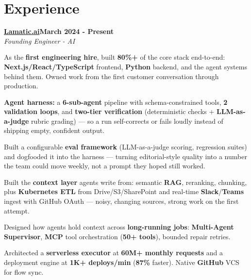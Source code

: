 \documentclass[letterpaper,10pt]{article}
\newcommand{\heading}[2]{
  \hspace{10pt}#1\hfill#2\\
}
\newcommand{\headingBf}[2]{
  \heading{\textbf{#1}}{\textbf{#2}}
}
\newcommand{\headingIt}[2]{
  \heading{\textit{#1}}{\textit{#2}}
}
\newenvironment{resume_list}{
  \vspace{-7pt}
  \begin{itemize}[itemsep=-2px, parsep=1pt, leftmargin=30pt]
}{
  \end{itemize}
}
\begin{document}

  \section{Experience}

\headingBf{\href{https://lamatic.ai/}{Lamatic.ai}}{March 2024 - Present}
\headingIt{Founding Engineer - AI}{}

\begin{resume_list}
\item As the \textbf{first engineering hire}, built \textbf{80\%+} of the core stack end-to-end: \textbf{Next.js/React/TypeScript} frontend, \textbf{Python} backend, and the agent systems behind them. Owned work from the first customer conversation through production.

\item \textbf{Agent harness:} a \textbf{6-sub-agent} pipeline with schema-constrained tools, \textbf{2 validation loops}, and \textbf{two-tier verification} (deterministic checks + \textbf{LLM-as-a-judge} rubric grading) --- so a run self-corrects or fails loudly instead of shipping empty, confident output.

\item Built a configurable \textbf{eval framework} (LLM-as-a-judge scoring, regression suites) and dogfooded it into the harness --- turning editorial-style quality into a number the team could move weekly, not a prompt they hoped still worked.

\item Built the \textbf{context layer} agents write from: semantic \textbf{RAG}, reranking, chunking, plus \textbf{Kubernetes ETL} from Drive/S3/SharePoint and real-time \textbf{Slack}/\textbf{Teams} ingest with GitHub OAuth --- noisy, changing sources, strong work on the first attempt.

\item Designed how agents hold context across \textbf{long-running jobs}: \textbf{Multi-Agent Supervisor}, \textbf{MCP} tool orchestration (\textbf{50+ tools}), bounded repair retries.

\item Architected a \textbf{serverless executor} at \textbf{60M+ monthly requests} and a deployment engine at \textbf{1K+ deploys/min} (\textbf{87\%} faster). Native \textbf{GitHub} VCS for flow sync.
\end{resume_list}


\end{document}
